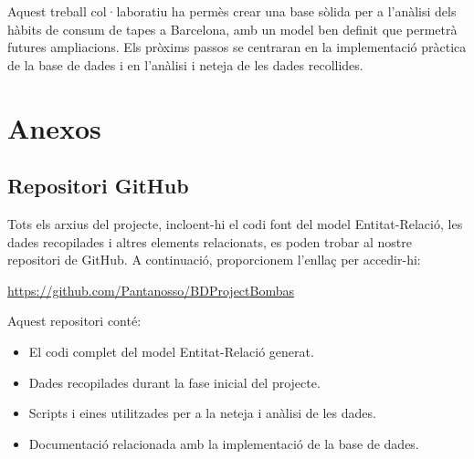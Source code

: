 \documentclass[12pt,a4paper]{article}
\begin{document}
Aquest treball col·laboratiu ha permès crear una base sòlida per a l'anàlisi dels hàbits de consum de tapes a Barcelona, amb un model ben definit que permetrà futures ampliacions. Els pròxims passos se centraran en la implementació pràctica de la base de dades i en l'anàlisi i neteja de les dades recollides.

\section{Anexos}

\subsection{Repositori GitHub}

Tots els arxius del projecte, incloent-hi el codi font del model Entitat-Relació, les dades recopilades i altres elements relacionats, es poden trobar al nostre repositori de GitHub. A continuació, proporcionem l'enllaç per accedir-hi:

\url{https://github.com/Pantanosso/BDProjectBombas}

Aquest repositori conté:
\begin{itemize}
    \item El codi complet del model Entitat-Relació generat.
    \item Dades recopilades durant la fase inicial del projecte.
    \item Scripts i eines utilitzades per a la neteja i anàlisi de les dades.
    \item Documentació relacionada amb la implementació de la base de dades.
\end{itemize}
\end{document}
